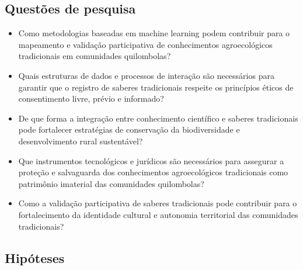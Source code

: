\subsection{Questões de pesquisa}

\begin{itemize}
\item{Como metodologias baseadas em machine learning podem contribuir para o mapeamento e validação participativa de conhecimentos agroecológicos tradicionais em comunidades quilombolas?}
\item{Quais estruturas de dados e processos de interação são necessários para garantir que o registro de saberes tradicionais respeite os princípios éticos de consentimento livre, prévio e informado?}
\item{De que forma a integração entre conhecimento científico e saberes tradicionais pode fortalecer estratégias de conservação da biodiversidade e desenvolvimento rural sustentável?}
\item{Que instrumentos tecnológicos e jurídicos são necessários para assegurar a proteção e salvaguarda dos conhecimentos agroecológicos tradicionais como patrimônio imaterial das comunidades quilombolas?}
\item{Como a validação participativa de saberes tradicionais pode contribuir para o fortalecimento da identidade cultural e autonomia territorial das comunidades tradicionais?}
\end{itemize}

\subsection{Hipóteses}

